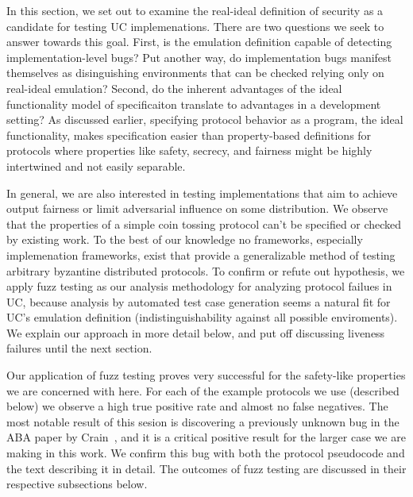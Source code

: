 In this section, we set out to examine the real-ideal definition of security as
a candidate for testing UC implemenations.  There are two questions we seek to
answer towards this goal.  First, is the emulation definition capable of
detecting implementation-level bugs?  Put another way, do implementation bugs
manifest themselves as disinguishing environments that can be checked relying only
on real-ideal emulation?  Second, do the inherent advantages of the ideal functionality
model of specificaiton translate to advantages in a development setting?  
As discussed earlier, specifying protocol behavior as a program, the ideal functionality, makes specification easier than property-based definitions for protocols where properties like safety, secrecy, and fairness might be highly intertwined and not easily separable.

In general, we are also interested in testing implementations that aim to achieve
output fairness or limit adversarial influence on some distribution.  We
observe that the properties of a simple coin tossing protocol can't be
specified or checked by existing work. To the best of our knowledge no
frameworks, especially implemenation frameworks, exist that provide a
generalizable method of testing arbitrary byzantine distributed protocols.  To
confirm or refute out hypothesis, we apply fuzz testing as our analysis
methodology for analyzing protocol failues in UC, because analysis by automated
test case generation seems a natural fit for UC's emulation definition
(indistinguishability against all possible enviroments).  We explain our
approach in more detail below, and put off discussing liveness failures until
the next section.

Our application of fuzz testing proves very successful for the safety-like
properties we are concerned with here.  For each of the example protocols we
use (described below) we observe a high true positive rate and almost no false
negatives.  The most notable result of this sesion is discovering a previously
unknown bug in the ABA paper by Crain~\cite{aba}, and it is a critical positive
result for the larger case we are making in this work.  We confirm this bug
with both the protocol pseudocode and the text describing it in detail.  The
outcomes of fuzz testing are discussed in their respective subsections below.

